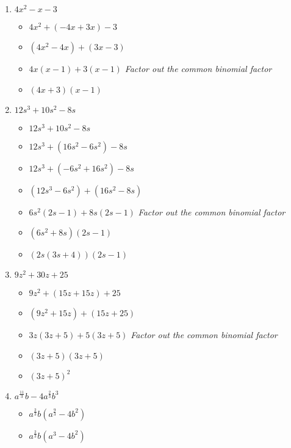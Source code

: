 \documentclass{article}
\begin{document}
\begin{onehalfspace}
\begin{enumerate}
        \item $4x^{2} - x - 3$
        \begin{itemize}
            \item $4x^{2} + (-4x + 3x) - 3$
            \item $(4x^{2} - 4x) + (3x - 3)$
            \item $4x(x - 1) + 3(x - 1)$ \textit{Factor out the common binomial factor}
            \item $(4x + 3)(x - 1)$
        \end{itemize}

        \item $12s^{3} + 10s^{2} - 8s$
        \begin{itemize}
            \item $12s^{3} + 10s^{2} - 8s$
            \item $12s^{3} + (16s^{2} - 6s^{2}) - 8s$
            \item $12s^{3} + (-6s^{2} + 16s^{2}) - 8s$
            \item $(12s^{3} - 6s^{2}) + (16s^{2} - 8s)$
            \item $6s^{2}(2s - 1) + 8s(2s - 1)$ \textit{Factor out the common binomial factor}
            \item $(6s^{2} + 8s)(2s - 1)$
            \item $(2s(3s + 4))(2s - 1)$
        \end{itemize}

        \item $9z^{2} + 30z + 25$
        \begin{itemize}
            \item $9z^{2} + (15z + 15z) + 25$
            \item $(9z^{2} + 15z) + (15z + 25)$
            \item $3z(3z + 5) + 5(3z + 5)$ \textit{Factor out the common binomial factor}
            \item $(3z + 5)(3z + 5)$
            \item $(3z + 5)^{2}$
        \end{itemize}

        \item $a^{\frac{11}{3}}b - 4a^{\frac{2}{3}}b^{3}$
        \begin{itemize}
            \item $a^{\frac{2}{3}}b(a^{\frac{9}{3}} - 4b^{2})$
            \item $a^{\frac{2}{3}}b(a^{3} - 4b^{2})$
        \end{itemize}


\end{enumerate}
\end{onehalfspace}
\end{document}
